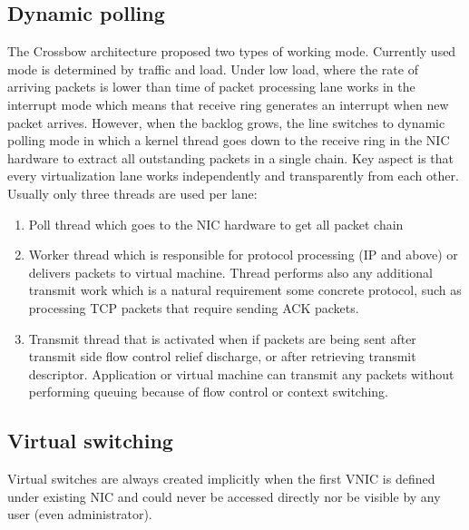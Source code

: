 \documentclass[11pt]{book}
\begin{document}
      \subsection{Dynamic polling}	
        
        The Crossbow architecture proposed two types of working mode. Currently used mode is determined by traffic and
        load. Under low load, where the rate of arriving packets is lower than time of packet processing lane works in
        the interrupt mode which means that receive ring generates an interrupt when new packet arrives. However, when
        the backlog grows, the line switches to dynamic polling mode in which a kernel thread goes down to the receive
        ring in the NIC hardware to extract all outstanding packets in a single chain. Key aspect is that every
        virtualization lane works independently and transparently from each other. Usually only three threads are used
        per lane:
        
        \begin{enumerate}
          \item Poll thread which goes to the NIC hardware to get all packet chain
          \item Worker thread which is responsible for protocol processing (IP and above) or delivers packets to virtual
                machine. Thread performs also any additional transmit work which is a natural 
                requirement some concrete protocol, such as processing TCP packets that require sending ACK packets.
          \item Transmit thread that is activated when if packets are being sent after transmit side flow control relief
                discharge, or after retrieving transmit descriptor. Application or virtual 
                machine can transmit any packets without performing queuing because of flow control or context switching.
        \end{enumerate}


      \subsection{Virtual switching}
        
        Virtual switches are always created implicitly when the first VNIC is defined under existing NIC and could never
        be accessed directly nor be visible by any user (even administrator). 
        
\end{document}
